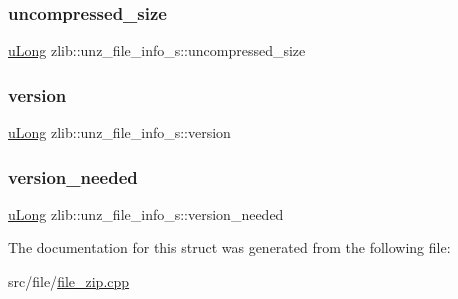 \subsubsection{\texorpdfstring{uncompressed\+\_\+size}{uncompressed\_size}}
{\footnotesize\ttfamily \hyperlink{namespacezlib_a3bc0123d9337acd75d286df79e6cf7da}{u\+Long} zlib\+::unz\+\_\+file\+\_\+info\+\_\+s\+::uncompressed\+\_\+size}

\mbox{\label{structzlib_1_1unz__file__info__s_a5a9d89ca344d9abd5fef8fb2724753eb}} 
\subsubsection{\texorpdfstring{version}{version}}
{\footnotesize\ttfamily \hyperlink{namespacezlib_a3bc0123d9337acd75d286df79e6cf7da}{u\+Long} zlib\+::unz\+\_\+file\+\_\+info\+\_\+s\+::version}

\mbox{\label{structzlib_1_1unz__file__info__s_aecec7894c06c1796619583f064aeb64a}} 
\subsubsection{\texorpdfstring{version\+\_\+needed}{version\_needed}}
{\footnotesize\ttfamily \hyperlink{namespacezlib_a3bc0123d9337acd75d286df79e6cf7da}{u\+Long} zlib\+::unz\+\_\+file\+\_\+info\+\_\+s\+::version\+\_\+needed}



The documentation for this struct was generated from the following file\+:\begin{DoxyCompactItemize}
\item 
src/file/\hyperlink{file__zip_8cpp}{file\+\_\+zip.\+cpp}\end{DoxyCompactItemize}
